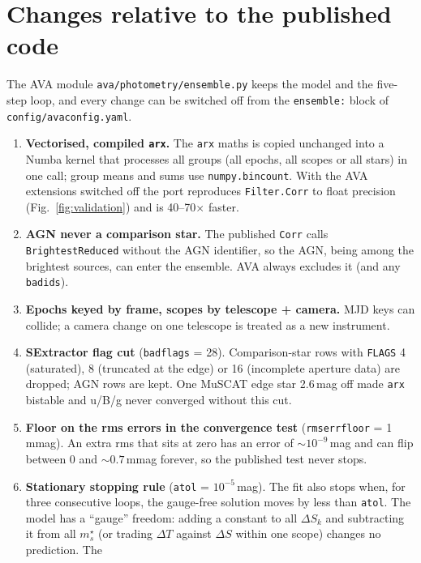 \documentclass[10pt,a4paper,oneside]{report}
\renewcommand{\_}{\oldunderscore\allowbreak}
\begin{document}
\section{Changes relative to the published code}
\label{sec:changes}

The AVA module \texttt{ava/photometry/ensemble.py} keeps the model and the five-step loop, and every
change can be switched off from the \texttt{ensemble:} block of \texttt{config/ava\_config.yaml}.

\begin{enumerate}
  \item \textbf{Vectorised, compiled \texttt{arx}.} The \texttt{arx} maths is copied unchanged into a
        Numba kernel that processes all groups (all epochs, all scopes or all stars) in one call;
        group means and sums use \texttt{numpy.bincount}. With the AVA extensions switched off the port
        reproduces \texttt{Filter.Corr} to float precision (Fig.~\ref{fig:validation}) and is
        40--70$\times$ faster.
  \item \textbf{AGN never a comparison star.} The published \texttt{Corr} calls
        \texttt{Brightest\_Reduced} without the AGN identifier, so the AGN, being among the brightest
        sources, can enter the ensemble. AVA always excludes it (and any \texttt{bad\_ids}).
  \item \textbf{Epochs keyed by frame, scopes by telescope + camera.} MJD keys can collide; a camera
        change on one telescope is treated as a new instrument.
  \item \textbf{SExtractor flag cut} (\texttt{bad\_flags} = 28). Comparison-star rows with
        \texttt{FLAGS} 4 (saturated), 8 (truncated at the edge) or 16 (incomplete aperture data) are
        dropped; AGN rows are kept. One MuSCAT edge star 2.6\,mag off made \texttt{arx} bistable and
        u/B/g never converged without this cut.
  \item \textbf{Floor on the rms errors in the convergence test} (\texttt{rms\_err\_floor} = 1\,mmag).
        An extra rms that sits at zero has an error of ${\sim}10^{-9}$\,mag and can flip between 0 and
        ${\sim}0.7$\,mmag forever, so the published test never stops.
  \item \textbf{Stationary stopping rule} (\texttt{atol} = $10^{-5}$\,mag). The fit also stops when,
        for three consecutive loops, the gauge-free solution moves by less than \texttt{atol}. The
        model has a ``gauge'' freedom: adding a constant to all $\Delta S_k$ and subtracting it from all
        $m^\star_s$ (or trading $\Delta T$ against $\Delta S$ within one scope) changes no prediction. The

\end{enumerate}
\end{document}
